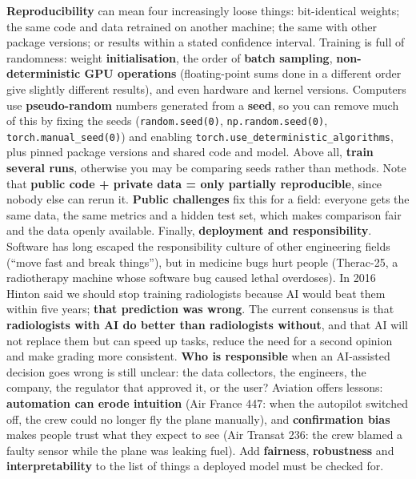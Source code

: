 \documentclass[a4paper]{article}
\newcommand{\K}[1]{\textcolor{kg}{\textbf{#1}}}
\newcommand{\E}[1]{\textcolor{ep}{#1}}
\newcommand{\T}[1]{\textcolor{tr}{\textbf{#1}}}
\begin{document}
\K{Reproducibility} can mean four increasingly loose things: bit-identical weights; the same code and data retrained on another machine; the same with other package versions; or results within a stated confidence interval. Training is full of randomness: weight \K{initialisation}, the order of \K{batch sampling}, \K{non-deterministic GPU operations} (floating-point sums done in a different order give slightly different results), and even hardware and kernel versions. Computers use \K{pseudo-random} numbers generated from a \K{seed}, so you can remove much of this by fixing the seeds (\E{\texttt{random.seed(0)}, \texttt{np.random.seed(0)}, \texttt{torch.manual\_seed(0)}}) and enabling \E{\texttt{torch.use\_deterministic\_algorithms}}, plus pinned package versions and shared code and model. Above all, \K{train several runs}, otherwise you may be comparing seeds rather than methods. Note that \T{public code + private data = only partially reproducible}, since nobody else can rerun it. \K{Public challenges} fix this for a field: everyone gets the same data, the same metrics and a hidden test set, which makes comparison fair and the data openly available.
Finally, \K{deployment and responsibility}. Software has long escaped the responsibility culture of other engineering fields (``move fast and break things''), but in medicine bugs hurt people (\E{Therac-25, a radiotherapy machine whose software bug caused lethal overdoses}). In 2016 Hinton said we should stop training radiologists because AI would beat them within five years; \T{that prediction was wrong}. The current consensus is that \K{radiologists with AI do better than radiologists without}, and that AI will not replace them but can speed up tasks, reduce the need for a second opinion and make grading more consistent. \T{Who is responsible} when an AI-assisted decision goes wrong is still unclear: the data collectors, the engineers, the company, the regulator that approved it, or the user? Aviation offers lessons: \K{automation can erode intuition} (\E{Air France 447: when the autopilot switched off, the crew could no longer fly the plane manually}), and \K{confirmation bias} makes people trust what they expect to see (\E{Air Transat 236: the crew blamed a faulty sensor while the plane was leaking fuel}). Add \K{fairness}, \K{robustness} and \K{interpretability} to the list of things a deployed model must be checked for.
\end{document}
